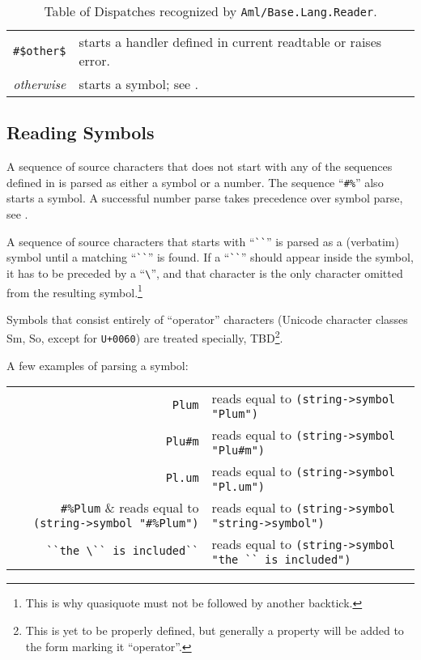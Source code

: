 \begin{table}
\begin{longtable}{ r l }
  \lstinline!#$other$! & starts a handler defined in current readtable or raises error. \\
  
  {\em otherwise} & starts a symbol; see \nameref{subsec:aml-base-lang-reader-symbols}. \\
\end{longtable}
\caption{\label{tab:aml-base-lang-reader-dispatch}Table of Dispatches recognized by \lstinline!Aml/Base.Lang.Reader!.}
\end{table}





\newpage

\subsection{Reading Symbols}
\label{subsec:aml-base-lang-reader-symbols}

A sequence of source characters that does not start with any of the sequences defined in  is parsed as either a symbol or a number. The sequence ``\lstinline!#%!'' also starts a symbol. A successful number parse takes precedence over symbol parse, see . 

A sequence of source characters that starts with ``\lstinline!``!'' is parsed as a (verbatim) symbol until a matching ``\lstinline!``!'' is found. If a ``\lstinline!``!'' should appear inside the symbol, it has to be preceded by a ``\lstinline!\!'', and that character is the only character omitted from the resulting symbol.\footnote{This is why quasiquote must not be followed by another backtick.}

Symbols that consist entirely of ``operator'' characters (Unicode character classes Sm, So, except for \lstinline!U+0060!) are treated specially, TBD\footnote{This is yet to be properly defined, but generally a property will be added to the form marking it ``operator''.}.

\example A few examples of parsing a symbol:

\begin{tabular}{ r l }
  \lstinline!Plum! & reads equal to \lstinline!(string->symbol "Plum")! \\
  \lstinline!Plu#m! & reads equal to \lstinline!(string->symbol "Plu#m")! \\
  \lstinline!Pl.um! & reads equal to \lstinline!(string->symbol "Pl.um")! \\
  \lstinline!#%Plum! & reads equal to \lstinline!(string->symbol "#%Plum")! \\
  \lstinline!string->symbol! & reads equal to \lstinline!(string->symbol "string->symbol")! \\
  \lstinline[deletekeywords={is}]!``the \`` is included``! & reads equal to \lstinline[deletekeywords={is}]!(string->symbol "the `` is included")! \\
\end{tabular}


